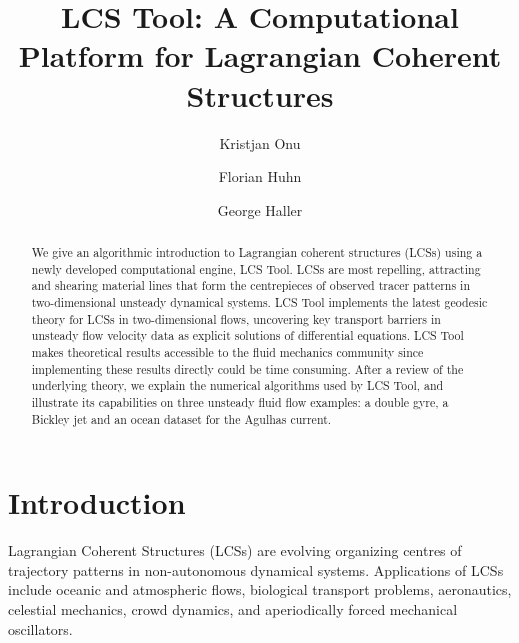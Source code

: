 \documentclass{article}
\title{LCS Tool: A Computational Platform for Lagrangian Coherent Structures}
\author{Kristjan Onu \and Florian Huhn \and George Haller}
\begin{document}

\maketitle

\begin{abstract}
We give an algorithmic introduction to Lagrangian coherent structures (LCSs) using a newly developed computational engine, LCS Tool.
LCSs are most repelling, attracting and shearing material lines that form the centrepieces of observed tracer patterns in two-dimensional unsteady dynamical systems.
LCS Tool implements the latest geodesic theory for LCSs in two-dimensional flows, uncovering key transport barriers in unsteady flow velocity data as explicit solutions of differential equations.
LCS Tool makes theoretical results accessible to the fluid mechanics community since implementing these results directly could be time consuming.
After a review of the underlying theory, we explain the numerical algorithms used by LCS Tool, and illustrate its capabilities on three unsteady fluid flow examples: a double gyre, a Bickley jet and an ocean dataset for the Agulhas current.
\end{abstract}

\tableofcontents

\section{Introduction}

Lagrangian Coherent Structures (LCSs) are evolving organizing centres of trajectory patterns in non-autonomous dynamical systems\parencite{haller00:_lagran,peacock13:_lagran,haller15:_langr_coher_struc}. Applications of LCSs include oceanic and atmospheric flows\parencite{beron-vera13:_objec_agulh,koh02:_hyper}, biological transport problems\parencite{wilson09:_lagran_reynol,tallapragada11:_lagran,huhn12:_south_indian_ocean_count_madag}, aeronautics\parencite{tang10:_accur_lagran_hong_kong_inter_airpor}, celestial mechanics\parencite{gawlik09:_lagran}, crowd dynamics\parencite{ali07:_lagran_partic_dynam_approac_crowd}, and aperiodically forced mechanical oscillators\parencite{hadjighasem13:_detec_kam}.
\end{document}
